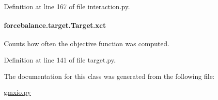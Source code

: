 Definition at line 167 of file interaction.\-py.

\hypertarget{classforcebalance_1_1target_1_1Target_aad2e385cfbf7b4a68f1c2cb41133fe82}{
\paragraph[{xct}]{\setlength{\rightskip}{0pt plus 5cm}forcebalance.\-target.\-Target.\-xct\hspace{0.3cm}{\ttfamily [inherited]}}}\label{classforcebalance_1_1target_1_1Target_aad2e385cfbf7b4a68f1c2cb41133fe82}


Counts how often the objective function was computed. 



Definition at line 141 of file target.\-py.



The documentation for this class was generated from the following file\-:\begin{DoxyCompactItemize}
\item 
\hyperlink{gmxio_8py}{gmxio.\-py}\end{DoxyCompactItemize}
